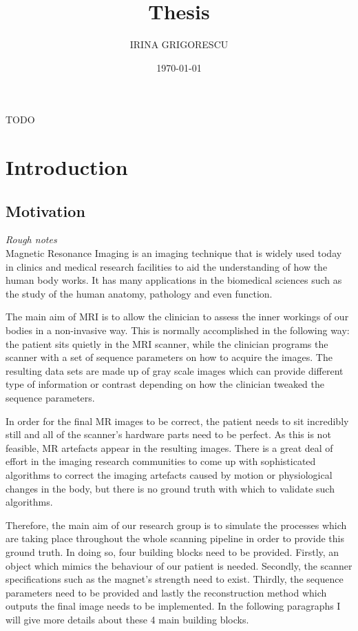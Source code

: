 \documentclass[11pt]{article}
\title{\vspace*{8em} Thesis\\ \vspace*{4em}}
\author{IRINA GRIGORESCU}
\date{\today}
\begin{document}
\maketitle
\thispagestyle{empty}

\clearpage
\abstract TODO
\clearpage


\section{Introduction}

\subsection{Motivation}

\textit{Rough notes} \\

Magnetic Resonance Imaging is an 
imaging technique that is widely used today in clinics and medical 
research facilities to aid the understanding of how the human body 
works. It has many applications in the biomedical sciences such as the study of the human anatomy, pathology and even function.

The main aim of MRI is to allow the clinician to assess the inner 
workings of our bodies in a non-invasive way. This is normally 
accomplished in the following way: the patient sits quietly in the MRI 
scanner, while the clinician programs the scanner with a set of sequence parameters on how to acquire the images. The resulting data sets are made up of gray scale images which can provide different type of information or contrast depending on how the clinician tweaked the sequence parameters. 

In order for the final MR images to be correct, the patient needs to 
sit incredibly still and all of the scanner's hardware parts need to be 
perfect. As this is not feasible, MR artefacts appear in the resulting 
images. There is a great deal of effort in the imaging research communities to come up with sophisticated algorithms to correct the imaging artefacts caused by motion or physiological changes in the body, but there is no ground truth with which to validate such algorithms.

Therefore, the main aim of our research group is to simulate the 
processes which are taking place throughout the whole scanning pipeline 
in order to provide this ground truth. In doing so, four building 
blocks need to be provided. Firstly, an object which mimics the behaviour of our patient is needed. Secondly, the scanner specifications such as the magnet's strength need to exist. Thirdly, the sequence parameters need to be provided and lastly the reconstruction method which outputs the final image needs to be implemented. In the following paragraphs I will give more details about these 4 main building blocks. 
\end{document}
